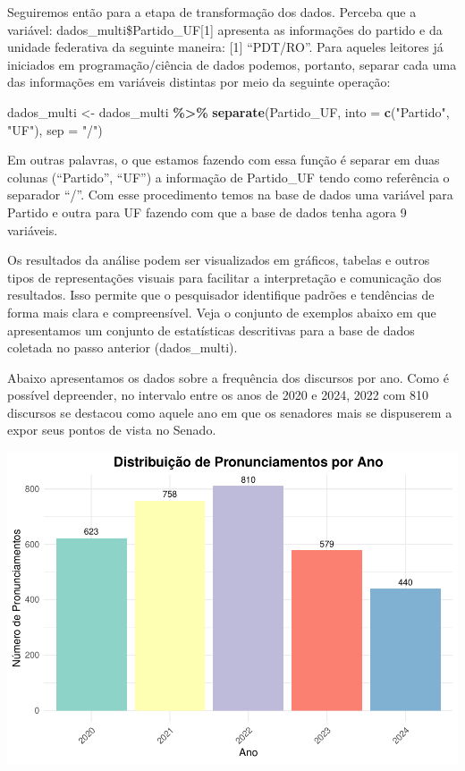 \documentclass{article}
\newenvironment{Shaded}{\begin{snugshade}}{\end{snugshade}}
\newcommand{\AttributeTok}[1]{\textcolor[rgb]{0.13,0.29,0.53}{#1}}
\newcommand{\FunctionTok}[1]{\textcolor[rgb]{0.13,0.29,0.53}{\textbf{#1}}}
\newcommand{\NormalTok}[1]{#1}
\newcommand{\OtherTok}[1]{\textcolor[rgb]{0.56,0.35,0.01}{#1}}
\newcommand{\SpecialCharTok}[1]{\textcolor[rgb]{0.81,0.36,0.00}{\textbf{#1}}}
\newcommand{\StringTok}[1]{\textcolor[rgb]{0.31,0.60,0.02}{#1}}
\begin{document}
Seguiremos então para a etapa de transformação dos dados. Perceba que a
variável: dados\_multi\$Partido\_UF{[}1{]} apresenta as informações do
partido e da unidade federativa da seguinte maneira: {[}1{]} ``PDT/RO''.
Para aqueles leitores já iniciados em programação/ciência de dados
podemos, portanto, separar cada uma das informações em variáveis
distintas por meio da seguinte operação:

\begin{Shaded}
\begin{Highlighting}[]
\NormalTok{dados\_multi }\OtherTok{\textless{}{-}}\NormalTok{ dados\_multi }\SpecialCharTok{\%\textgreater{}\%} 
                  \FunctionTok{separate}\NormalTok{(Partido\_UF, }\AttributeTok{into =} \FunctionTok{c}\NormalTok{(}\StringTok{"Partido"}\NormalTok{, }\StringTok{"UF"}\NormalTok{), }\AttributeTok{sep =} \StringTok{"/"}\NormalTok{)}
\end{Highlighting}
\end{Shaded}

Em outras palavras, o que estamos fazendo com essa função é separar em
duas colunas (``Partido'', ``UF'') a informação de Partido\_UF tendo
como referência o separador ``/''. Com esse procedimento temos na base
de dados uma variável para Partido e outra para UF fazendo com que a
base de dados tenha agora 9 variáveis.

Os resultados da análise podem ser visualizados em gráficos, tabelas e
outros tipos de representações visuais para facilitar a interpretação e
comunicação dos resultados. Isso permite que o pesquisador identifique
padrões e tendências de forma mais clara e compreensível. Veja o
conjunto de exemplos abaixo em que apresentamos um conjunto de
estatísticas descritivas para a base de dados coletada no passo anterior
(dados\_multi).

Abaixo apresentamos os dados sobre a frequência dos discursos por ano.
Como é possível depreender, no intervalo entre os anos de 2020 e 2024,
2022 com 810 discursos se destacou como aquele ano em que os senadores
mais se dispuserem a expor seus pontos de vista no Senado.

\includegraphics{Texto_files/figure-latex/unnamed-chunk-11-1.pdf}
\end{document}
